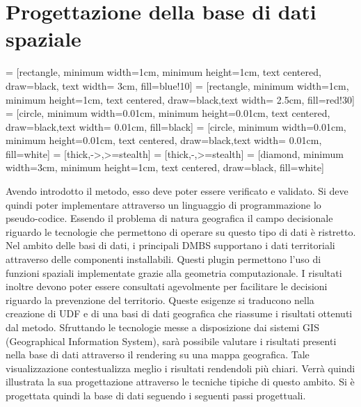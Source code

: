 
\chapter{Progettazione della base di dati spaziale}

 = [rectangle, minimum width=1cm, minimum height=1cm, text centered, draw=black, text width= 3cm, fill=blue!10]
 = [rectangle, minimum width=1cm, minimum height=1cm, text centered, draw=black,text width= 2.5cm, fill=red!30]
 = [circle, minimum width=0.01cm, minimum height=0.01cm, text centered, draw=black,text width= 0.01cm, fill=black]
 = [circle, minimum width=0.01cm, minimum height=0.01cm, text centered, draw=black,text width= 0.01cm, fill=white]
 = [thick,->,>=stealth]
 = [thick,-,>=stealth]
 = [diamond, minimum width=3cm, minimum height=1cm, text centered, draw=black, fill=white]

 
Avendo introdotto il metodo, esso deve poter essere verificato e validato. 
Si deve quindi poter implementare attraverso un linguaggio di programmazione lo pseudo-codice. Essendo il problema di natura geografica il campo decisionale riguardo le tecnologie che permettono di operare su questo tipo di dati è ristretto.
Nel ambito delle basi di dati, i principali DMBS supportano i dati territoriali attraverso delle componenti installabili. Questi plugin permettono l'uso di funzioni
spaziali implementate grazie alla geometria computazionale. I risultati inoltre devono poter essere consultati agevolmente per facilitare le decisioni riguardo la prevenzione del territorio. Queste esigenze si traducono nella creazione di UDF e di una basi di dati geografica che riassume i risultati ottenuti dal metodo. Sfruttando le tecnologie messe a disposizione dai sistemi GIS (Geographical Information System), sarà possibile valutare i risultati presenti nella base di dati attraverso il rendering su una mappa geografica. Tale visualizzazione contestualizza meglio i risultati rendendoli più chiari. Verrà quindi illustrata la sua progettazione attraverso le tecniche tipiche di questo ambito.
Si è progettata quindi la base di dati seguendo i seguenti passi progettuali.

